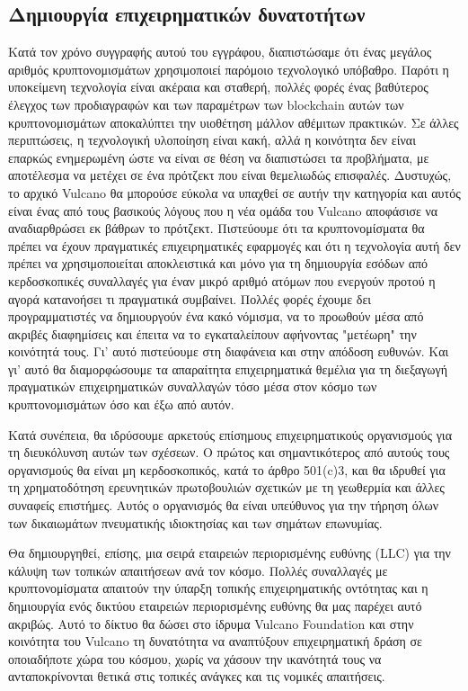 \documentclass[A4paper, 12pt]{article}
\begin{document}
\subsection{Δημιουργία επιχειρηματικών δυνατοτήτων}
Κατά τον χρόνο συγγραφής αυτού του εγγράφου, διαπιστώσαμε ότι ένας μεγάλος αριθμός κρυπτονομισμάτων χρησιμοποιεί παρόμοιο τεχνολογικό υπόβαθρο. Παρότι η υποκείμενη τεχνολογία είναι ακέραια και σταθερή, πολλές φορές ένας βαθύτερος έλεγχος των προδιαγραφών και των παραμέτρων των blockchain αυτών των κρυπτονομισμάτων αποκαλύπτει την υιοθέτηση μάλλον αθέμιτων πρακτικών. Σε άλλες περιπτώσεις, η τεχνολογική υλοποίηση είναι κακή, αλλά η κοινότητα δεν είναι επαρκώς ενημερωμένη ώστε να είναι σε θέση να διαπιστώσει τα προβλήματα, με αποτέλεσμα να μετέχει σε ένα πρότζεκτ που είναι θεμελιωδώς επισφαλές.
Δυστυχώς, το αρχικό Vulcano θα μπορούσε εύκολα να υπαχθεί σε αυτήν την κατηγορία και αυτός είναι ένας από τους βασικούς λόγους που η νέα ομάδα του Vulcano αποφάσισε να αναδιαρθρώσει εκ βάθρων το πρότζεκτ. Πιστεύουμε ότι τα κρυπτονομίσματα θα πρέπει να έχουν πραγματικές επιχειρηματικές εφαρμογές και ότι η τεχνολογία αυτή δεν πρέπει να χρησιμοποιείται αποκλειστικά και μόνο για τη δημιουργία εσόδων από κερδοσκοπικές συναλλαγές για έναν μικρό αριθμό ατόμων που ενεργούν προτού η αγορά κατανοήσει τι πραγματικά συμβαίνει. Πολλές φορές έχουμε δει προγραμματιστές να δημιουργούν ένα κακό νόμισμα, να το προωθούν μέσα από ακριβές διαφημίσεις και έπειτα να το εγκαταλείπουν αφήνοντας "μετέωρη" την κοινότητά τους. Γι' αυτό πιστεύουμε στη διαφάνεια και στην απόδοση ευθυνών. Και γι' αυτό θα διαμορφώσουμε τα απαραίτητα επιχειρηματικά θεμέλια για τη διεξαγωγή πραγματικών επιχειρηματικών συναλλαγών τόσο μέσα στον κόσμο των κρυπτονομισμάτων όσο και έξω από αυτόν.

Κατά συνέπεια, θα ιδρύσουμε αρκετούς επίσημους επιχειρηματικούς οργανισμούς για τη διευκόλυνση αυτών των σχέσεων. Ο πρώτος και σημαντικότερος από αυτούς τους οργανισμούς θα είναι μη κερδοσκοπικός, κατά το άρθρο 501(c)3, και θα ιδρυθεί για τη χρηματοδότηση ερευνητικών πρωτοβουλιών σχετικών με τη γεωθερμία και άλλες συναφείς επιστήμες. Αυτός ο οργανισμός θα είναι υπεύθυνος για την τήρηση όλων των δικαιωμάτων πνευματικής ιδιοκτησίας και των σημάτων επωνυμίας.

Θα δημιουργηθεί, επίσης, μια σειρά εταιρειών περιορισμένης ευθύνης (LLC) για την κάλυψη των τοπικών απαιτήσεων ανά τον κόσμο. Πολλές συναλλαγές με κρυπτονομίσματα απαιτούν την ύπαρξη τοπικής επιχειρηματικής οντότητας και η δημιουργία ενός δικτύου εταιρειών περιορισμένης ευθύνης θα μας παρέχει αυτό ακριβώς. Αυτό το δίκτυο θα δώσει στο ίδρυμα Vulcano Foundation και στην κοινότητα του Vulcano τη δυνατότητα να αναπτύξουν επιχειρηματική δράση σε οποιαδήποτε χώρα του κόσμου, χωρίς να χάσουν την ικανότητά τους να ανταποκρίνονται θετικά στις τοπικές ανάγκες και τις νομικές απαιτήσεις.
\end{document}
